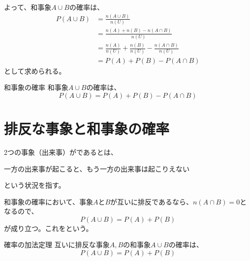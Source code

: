 \documentclass[../../../topic_statistics]{subfiles}
\begin{document}
よって、和事象$A \cup B$の確率は、
\begin{align*}
  P(A \cup B) & = \frac{n(A \cup B)}{n(U)}                                         \\
              & = \frac{n(A) + n(B) - n(A \cap B)}{n(U)}                           \\
              & = \frac{n(A)}{n(U)} + \frac{n(B)}{n(U)} - \frac{n(A \cap B)}{n(U)} \\
              & = P(A) + P(B) - P(A \cap B)
\end{align*}
として求められる。

\begin{theorem}{和事象の確率}
  和事象$A \cup B$の確率は、
  \begin{equation*}
    P(A \cup B) = P(A) + P(B) - P(A \cap B)
  \end{equation*}
\end{theorem}

\sectionline
\section{排反な事象と和事象の確率}

2つの事象（出来事）がであるとは、
\begin{emphabox}
  \begin{spacebox}
    \begin{center}
      一方の出来事が起こると、もう一方の出来事は起こりえない
    \end{center}
  \end{spacebox}
\end{emphabox}
という状況を指す。

\br

\begin{center}
\end{center}

\br

和事象の確率において、事象$A$と$B$が互いに排反であるなら、$n(A \cap B) = 0$となるので、
\begin{equation*}
  P(A \cup B) = P(A) + P(B)
\end{equation*}
が成り立つ。これをという。

\begin{theorem}{確率の加法定理}
  互いに排反な事象$A,B$の和事象$A \cup B$の確率は、
  \begin{equation*}
    P(A \cup B) = P(A) + P(B)
  \end{equation*}
\end{theorem}
\end{document}
